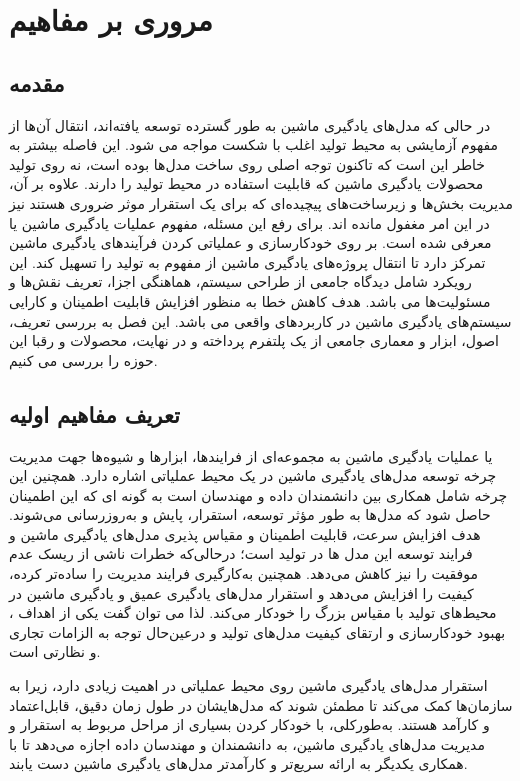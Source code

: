 \chapter{مروری بر مفاهیم }\label{ch:HVS}
 
\section{مقدمه}
 
در حالی که مدل‌های یادگیری ماشین به طور گسترده‌ توسعه یافته‌اند، انتقال آن‌ها از مفهوم آزمایشی به محیط تولید اغلب با شکست مواجه می شود. این فاصله بیشتر به خاطر این است که تاکنون توجه اصلی روی ساخت مدل‌ها بوده است، نه روی تولید محصولات یادگیری ماشین که قابلیت استفاده در محیط تولید را دارند. علاوه بر آن، مدیریت بخش‌ها و زیرساخت‌های پیچیده‌ای که برای یک استقرار موثر ضروری هستند نیز در این امر مغفول مانده اند. برای رفع این مسئله، مفهوم عملیات یادگیری ماشین یا  معرفی شده است.  بر روی خودکارسازی و عملیاتی کردن فرآیندهای یادگیری ماشین تمرکز دارد تا انتقال پروژه‌های یادگیری ماشین از مفهوم به تولید را تسهیل کند. این رویکرد شامل دیدگاه جامعی از طراحی سیستم، هماهنگی اجزا، تعریف نقش‌ها و مسئولیت‌ها می باشد. هدف کاهش خطا به منظور افزایش قابلیت اطمینان و کارایی سیستم‌های یادگیری ماشین در کاربردهای واقعی می باشد. این فصل به بررسی تعریف، اصول، ابزار و معماری جامعی از یک پلتفرم   پرداخته و در نهایت، محصولات و رقبا این حوزه را بررسی می کنیم.

\section{تعریف مفاهیم اولیه}

 یا عملیات یادگیری ماشین به مجموعه‌ای از فرایندها، ابزارها و شیوه‌ها جهت مدیریت چرخه توسعه مدل‌های یادگیری ماشین در یک محیط عملیاتی اشاره دارد. همچنین این چرخه شامل همکاری بین دانشمندان داده و مهندسان  است به گونه ای که این اطمینان حاصل شود که مدل‌ها به طور مؤثر توسعه، استقرار، پایش و به‌روزرسانی می‌شوند. هدف  افزایش سرعت، قابلیت اطمینان و مقیاس پذیری مدل‌های یادگیری ماشین و فرایند توسعه این مدل ها در تولید است؛ درحالی‌که خطرات ناشی از ریسک عدم موفقیت را نیز کاهش می‌دهد. همچنین به‌کارگیری  فرایند مدیریت را ساده‌تر کرده، کیفیت را افزایش می‌دهد و استقرار مدل‌های یادگیری عمیق و یادگیری ماشین در محیط‌های تولید با مقیاس بزرگ را خودکار می‌کند. لذا می توان گفت یکی از اهداف ، بهبود خودکارسازی و ارتقای کیفیت مدل‌های تولید و درعین‌حال توجه به الزامات تجاری و نظارتی است. 
 
 
 استقرار مدل‌های یادگیری ماشین روی محیط عملیاتی در  اهمیت زیادی دارد، زیرا به سازمان‌ها کمک می‌کند تا مطمئن شوند که مدل‌هایشان در طول زمان دقیق، قابل‌اعتماد و کارآمد هستند. به‌طورکلی،  با خودکار کردن بسیاری از مراحل مربوط به استقرار و مدیریت مدل‌های یادگیری ماشین، به دانشمندان و مهندسان داده اجازه می‌دهد تا با همکاری یکدیگر به ارائه سریع‌تر و کارآمدتر مدل‌های یادگیری ماشین دست یابند. 

